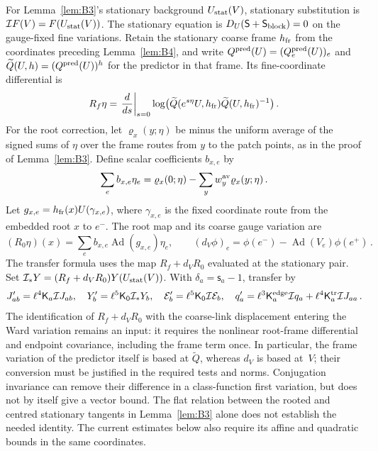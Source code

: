 For Lemma~\ref{lem:B3}'s stationary background $U_{\rm stat}(V)$, stationary substitution is $\mathcal IF(V)=F(U_{\rm stat}(V))$. The stationary equation is $D_U(\mathsf S+\mathsf S_{\rm block})=0$ on the gauge-fixed fine variations. Retain the stationary coarse frame $h_{\rm fr}$ from the coordinates preceding Lemma~\ref{lem:B4}, and write $Q^{\rm pred}(U)=(Q_e^{\rm pred}(U))_e$ and $\widetilde Q(U,h)=(Q^{\rm pred}(U))^h$ for the predictor in that frame. Its fine-coordinate differential is
\begin{equation*}
R_f\eta=\left.\frac{d}{ds}\right|_{s=0}
\log\bigl(\widetilde Q(e^{s\eta}U,h_{\rm fr})\widetilde Q(U,h_{\rm fr})^{-1}\bigr)\,.
\end{equation*}
For the root correction, let $\varrho_x(y;\eta)$ be minus the uniform average of the signed sums of $\eta$ over the frame routes from $y$ to the patch points, as in the proof of Lemma~\ref{lem:B3}. Define scalar coefficients $b_{x,e}$ by
\begin{equation*}
\sum_e b_{x,e}\eta_e=\varrho_x(0;\eta)-\sum_yw_y^{\rm av}\varrho_x(y;\eta)\,.
\end{equation*}
Let $g_{x,e}=h_{\rm fr}(x)U(\gamma_{x,e})$, where $\gamma_{x,e}$ is the fixed coordinate route from the embedded root $x$ to $e^-$. The root map and its coarse gauge variation are
\begin{equation*}
(R_0\eta)(x)=\sum_e b_{x,e}\operatorname{Ad}(g_{x,e})\eta_e,
\qquad (d_V\phi)_e=\phi(e^-)-\operatorname{Ad}(V_e)\phi(e^+)\,.
\end{equation*}
The transfer formula uses the map $R_f+d_VR_0$ evaluated at the stationary pair. Set $\mathcal I_*Y=(R_f+d_VR_0)Y(U_{\rm stat}(V))$. With $\delta_a=\mathsf s_a-1$, transfer by
\begin{equation}\label{eq:I-transfer-map}
J'_{ab}=\ell^4\mathsf K_a\mathcal IJ_{ab},\quad Y'_b=\ell^5\mathsf K_0\mathcal I_*Y_b,\quad
\mathcal E'_b=\ell^5\mathsf K_0\mathcal I\mathcal E_b,\quad
q'_a=\ell^3\mathsf K_a^{\rm edge}\mathcal Iq_a+\ell^4\mathsf K_a^{\rm tr}\mathcal IJ_{aa}\,.
\end{equation}
The identification of $R_f+d_VR_0$ with the coarse-link displacement entering the Ward variation remains an input: it requires the nonlinear root-frame differential and endpoint covariance, including the frame term once. In particular, the frame variation of the predictor itself is based at $\widetilde Q$, whereas $d_V$ is based at~$V$; their conversion must be justified in the required tests and norms. Conjugation invariance can remove their difference in a class-function first variation, but does not by itself give a vector bound. The flat relation between the rooted and centred stationary tangents in Lemma~\ref{lem:B3} alone does not establish the needed identity. The current estimates below also require its affine and quadratic bounds in the same coordinates.

